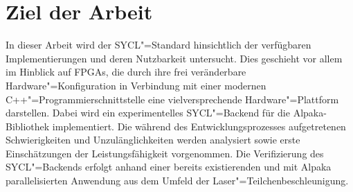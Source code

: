 \section{Ziel der Arbeit}\label{einleitung:ziel}

In dieser Arbeit wird der SYCL"=Standard hinsichtlich der verfügbaren
Implementierungen und deren Nutzbarkeit untersucht. Dies geschieht vor allem im
Hinblick auf FPGAs, die durch ihre frei veränderbare Hardware"=Konfiguration in
Verbindung mit einer modernen C++"=Programmierschnittstelle eine
vielversprechende Hardware"=Plattform darstellen. Dabei wird ein
experimentelles SYCL"=Backend für die Alpaka-Bibliothek implementiert. Die
während des Entwicklungsprozesses aufgetretenen Schwierigkeiten und
Unzulänglichkeiten werden analysiert sowie erste Einschätzungen der
Leistungsfähigkeit vorgenommen. Die Verifizierung des SYCL"=Backends erfolgt
anhand einer bereits existierenden und mit Alpaka parallelisierten Anwendung aus
dem Umfeld der Laser"=Teilchenbeschleunigung.
